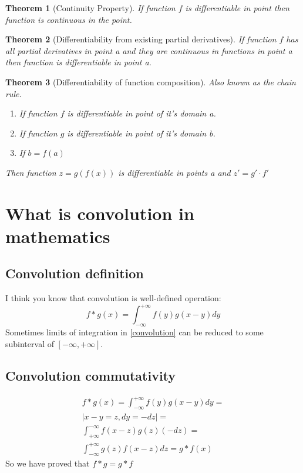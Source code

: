 \documentclass[12pt,a4paper]{article}
\theoremstyle{plain}
\newtheorem{theorem}{Theorem}[section]
\begin{document}
\begin{theorem} [Continuity Property]
 If function $f$ is differentiable in point then function is continuous in the point.
\end{theorem}
\begin{theorem} [Differentiability from existing partial derivatives]
 If function $f$ has all partial derivatives in point \textit{a} and they are continuous in functions in point \textit{a} then function is differentiable in point \textit{a}.
\end{theorem}
\begin{theorem} [Differentiability of function composition] Also known as the chain rule.
 \begin{enumerate}
  \item  If function $f$ is differentiable in point of it's domain \textit{a}.
  \item  If function $g$ is differentiable in point of it's domain \textit{b}.
  \item  If $b = f(a)$
 \end{enumerate}
 Then function $z=g(f(x))$ is differentiable in points \textit{a} and 
 $z' = g' \cdot f'$
\end{theorem}
\section{What is convolution in mathematics}
\subsection{Convolution definition}
I think you know that convolution is well-defined operation:
\begin{equation}\label{convolution}
f*g(x)=\int^{+\infty}_{-\infty} f(y)g(x-y)dy
\end{equation}
Sometimes limits of integration in \eqref{convolution} can be reduced to some subinterval of $[-\infty, +\infty]$.
\subsection{Convolution commutativity}
\begin{multline}\label{convolution_commutativity}
f*g(x)=\int^{+\infty}_{-\infty} f(y)g(x-y)dy=\\
|x-y=z,dy=-dz|=\\
\int^{-\infty}_{+\infty}  f(x-z)g(z)(-dz)=\\
\int^{+\infty}_{-\infty}  g(z)f(x-z)dz=g*f(x)
\end{multline}
So we have proved that $f*g=g*f$
\end{document}
